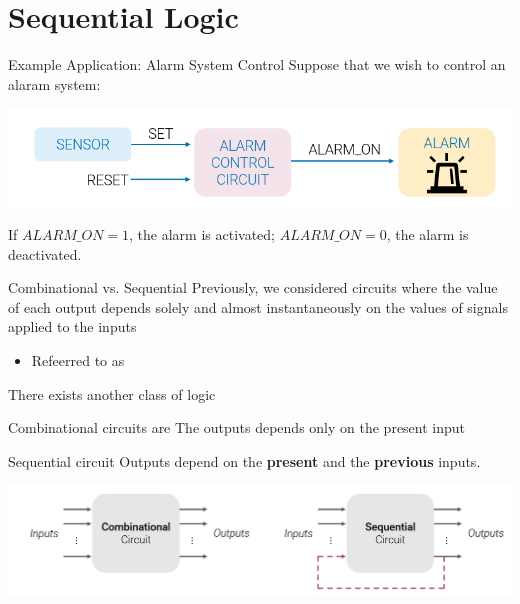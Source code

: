     \section{Sequential Logic}
    \begin{parag}{Example Application: Alarm System Control}
        Suppose that we wish to control an alaram system:
        \begin{center}
            \includegraphics[scale=0.5]{12025-03-31.png}
        \end{center}
        If $ALARM\_ON = 1$, the alarm is activated; $ALARM\_ON = 0$, the alarm is deactivated.\\
    \end{parag}
    \begin{parag}{Combinational vs. Sequential}
        Previously, we considered circuits where the value of each output depends solely and almost instantaneously on the values of signals applied to the inputs
        \begin{itemize}
            \item Refeerred to as 
        \end{itemize}
        There exists another class of logic
    
        \begin{subparag}{Combinational circuits are }
            The outputs depends only on the present input
        \end{subparag}
        \begin{subparag}{Sequential circuit}
            Outputs depend on the \textbf{present} and the \textbf{previous} inputs.
        \end{subparag}
        \begin{center}
            \includegraphics[scale=0.5]{22025-03-31.png}
        \end{center}
        
    \end{parag}
